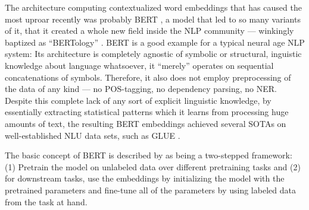 The architecture computing contextualized word embeddings that has caused the most uproar
recently was probably BERT \cite{devlin2018bert}, a model that led to so many variants of
it, that it created a whole new field inside the NLP community --- winkingly baptized as
``BERTology'' \cite{rogers2020primer}. BERT is a good example for a typical neural age
NLP system: Its architecture is completely agnostic of symbolic or structural, inguistic
knowledge about language whatsoever, it ``merely'' operates on sequential concatenations
of symbols. Therefore, it also does not employ preprocessing of the data of any kind ---
no POS-tagging, no dependency parsing, no NER. Despite this complete lack of any sort
of explicit linguistic knowledge, by essentially extracting statistical patterns which
it learns from processing huge amounts of text, the resulting BERT embeddings achieved
several SOTAs on well-established NLU data sets, such as GLUE \cite{wang2018glue}.


The basic concept of BERT is described by \citeauthor{devlin2018bert} as
being a two-stepped framework: (1) Pretrain the model on unlabeled data over
different pretraining tasks and (2) for downstream tasks, use the embeddings by initializing
the model with the pretrained parameters and fine-tune all of the parameters
by using labeled data from the task at hand.

